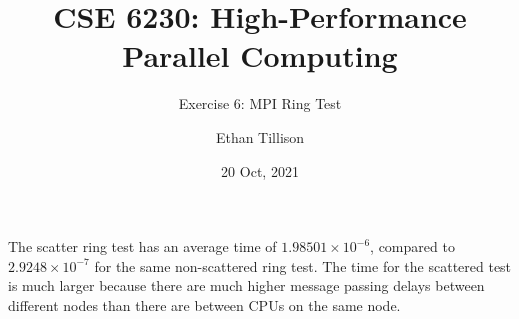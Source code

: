 \documentclass{article}
\title{CSE 6230: High-Performance Parallel Computing}
\subtitle{Exercise 6: MPI Ring Test}
\author{Ethan Tillison}
\date{20 Oct, 2021}
\begin{document}
\maketitle
\begin{center}	
\end{center}

The scatter ring test has an average time of $1.98501 \times 10^{-6}$, compared to $2.9248 \times 10^{-7}$ for the same non-scattered ring test. The time for the scattered test is much larger because there are much higher message passing delays between different nodes than there are between CPUs on the same node.
\end{document}
